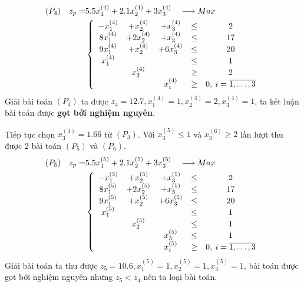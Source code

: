 \documentclass[12pt,a4paper]{report}
\begin{document}
    \begin{equation*}
      \begin{split}
          (P_4) \quad z_p= & 5.5x^{(4)}_1 + 2.1x^{(4)}_2 + 3x^{(4)}_3 \quad \longrightarrow Max \\
          & \left\{\begin{array} {ccccc}
           -x^{(4)}_1 &+ x^{(4)}_2 &+ x^{(4)}_3 &\leq& 2 \\
           8x^{(4)}_1 &+ 2x^{(4)}_2 &+ x^{(4)}_3&\leq& 17 \\
           9x^{(4)}_1 &+ x^{(4)}_2 &+ 6x^{(4)}_3 &\leq& 20 \\
           x^{(4)}_1 &&&\leq& 1 \\
           &x^{(4)}_2 &&\geq& 2 \\
          &&x^{(4)}_i &\geq& 0 , \: i=\overline{\rm 1, \ldots ,3} \\
          \end{array}\right. \\
      \end{split}
    \end{equation*}
    Giải bài toán $(P_4)$ ta được $z_4=12.7, x^{(4)}_1=1, x^{(4)}_2=2, x^{(4)}_3=1$, ta kết luận bài toán được  \textbf{gọt bởi nghiệm nguyên}.
    
    
    
    Tiếp tục chọn $x^{(3)}_3=1.66$ từ $(P_3)$. Với $x^{(5)}_3 \leq 1$ và $x^{(6)}_3 \geq 2$ lần lượt thu được 2 bài toán $(P_5)$ và $(P_6)$.
    \begin{equation*}
      \begin{split}
          (P_5) \quad z_p= & 5.5x^{(5)}_1 + 2.1x^{(5)}_2 + 3x^{(5)}_3 \quad \longrightarrow Max \\
          & \left\{\begin{array} {ccccc}
           -x^{(5)}_1&+ x^{(5)}_2 &+ x^{(5)}_3 &\leq& 2 \\
           8x^{(5)}_1 &+ 2x^{(5)}_2 &+ x^{(5)}_3&\leq& 17 \\
           9x^{(5)}_1 &+ x^{(5)}_2 &+ 6x^{(5)}_3 &\leq& 20 \\
           x^{(5)}_1 &&&\leq& 1 \\
           &x^{(5)}_2 &&\leq &1 \\
           &&x^{(5)}_3 &\leq& 1 \\
          &&x^{(5)}_i &\geq& 0 , \: i=\overline{\rm 1, \ldots ,3} \\
          \end{array}\right. \\
      \end{split}
    \end{equation*}
    Giải bài toán ta thu được $z_5=10.6, x^{(5)}_1=1, x^{(5)}_2=1, x^{(5)}_3=1$, bài toán được gọt bởi nghiệm nguyên nhưng $z_5<z_4$ nên ta loại bài toán.
    
\end{document}
